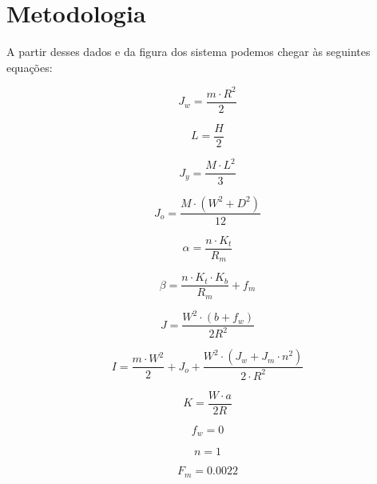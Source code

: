 \documentclass[12pt]{article}
\begin{document}
\section{Metodologia}

\quad A partir desses dados e da figura dos sistema podemos chegar às seguintes equações:

\begin{equation}
    J_w = \frac{m\cdot R^2}{2}
\end{equation}

\begin{equation}
    L = \frac{H}{2}
\end{equation}

\begin{equation}
    J_y = \frac{M \cdot L^2}{3}
\end{equation}
 
\begin{equation}
    J_o = \frac{M \cdot(W^2 + D^2)}{12}
\end{equation} 

\begin{equation}
    \alpha = \frac{n \cdot K_t}{R_m}
\end{equation}

\begin{equation}
    \beta = \frac{n \cdot K_t \cdot K_b}{R_m} + f_m
\end{equation}

\begin{equation}
    J = \frac{W^2 \cdot (b + f_w)}{2R^2}
\end{equation}

\begin{equation}
    I = \frac{m \cdot W^2}{2} + J_o + \frac{W^2 \cdot (J_w + J_m \cdot n^2)}{2 \cdot R^2}
\end{equation}

\begin{equation}
    K = \frac{W \cdot a}{2R}
\end{equation}

\begin{equation}
    f_w = 0
\end{equation}

\begin{equation}
    n = 1
\end{equation}

\begin{equation}
    F_m = 0.0022
\end{equation}
 
\end{document}
